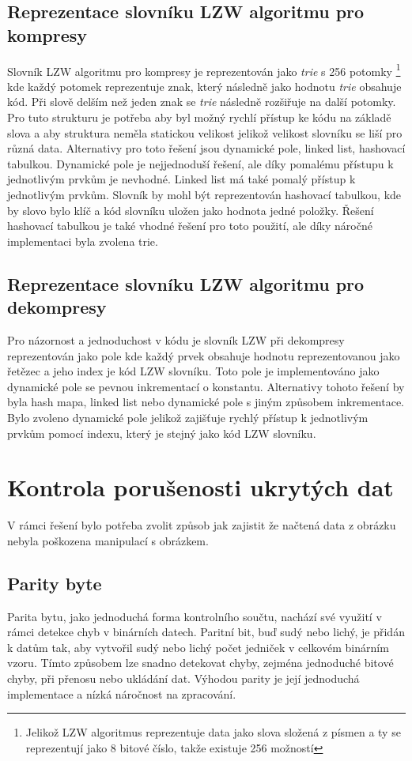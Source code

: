 \documentclass[12pt]{report}
\begin{document}
\subsection{Reprezentace slovníku LZW algoritmu pro kompresy}
Slovník LZW algoritmu pro kompresy je reprezentován jako \textit{trie} s 256 potomky \footnote{Jelikož LZW algoritmus reprezentuje data jako slova složená z písmen a ty se reprezentují jako 8 bitové číslo, takže existuje 256 možností} kde každý potomek reprezentuje znak, který následně jako hodnotu \textit{trie} obsahuje kód. Při slově delším než jeden znak se \textit{trie} následně rozšiřuje na další potomky.
Pro tuto strukturu je potřeba aby byl možný rychlí přístup ke kódu na základě slova a aby struktura neměla statickou velikost jelikož velikost slovníku se liší pro různá data.
Alternativy pro toto řešení jsou dynamické pole, linked list, hashovací tabulkou. Dynamické pole je nejjednoduší řešení, ale díky pomalému přístupu k jednotlivým prvkům je nevhodné. Linked list má také pomalý přístup k jednotlivým prvkům. Slovník by mohl být reprezentován hashovací tabulkou, kde by slovo bylo klíč a kód slovníku uložen jako hodnota jedné položky. Řešení hashovací tabulkou je také vhodné řešení pro toto použití, ale díky náročné implementaci byla zvolena trie.

\subsection{Reprezentace slovníku LZW algoritmu pro dekompresy}
    Pro názornost a jednoduchost v kódu je slovník LZW při dekompresy reprezentován jako pole  kde každý prvek obsahuje hodnotu reprezentovanou jako řetězec a jeho index je kód LZW slovníku.
    Toto pole je implementováno jako dynamické pole se pevnou inkrementací o konstantu. 
    Alternativy tohoto řešení by byla hash mapa, linked list nebo dynamické pole s jiným způsobem inkrementace. 
    Bylo zvoleno dynamické pole jelikož zajišťuje rychlý přístup k jednotlivým prvkům pomocí indexu, který je stejný jako kód LZW slovníku.


    \section{Kontrola porušenosti ukrytých dat}
    V rámci řešení bylo potřeba zvolit způsob jak zajistit že načtená data z obrázku nebyla poškozena manipulací s obrázkem.
\subsection{Parity byte}
Parita bytu, jako jednoduchá forma kontrolního součtu, nachází své využití v rámci detekce chyb v binárních datech. Paritní bit, buď sudý nebo lichý, je přidán k datům tak, aby vytvořil sudý nebo lichý počet jedniček v celkovém binárním vzoru. Tímto způsobem lze snadno detekovat chyby, zejména jednoduché bitové chyby, při přenosu nebo ukládání dat. Výhodou parity je její jednoduchá implementace a nízká náročnost na zpracování.
\end{document}

